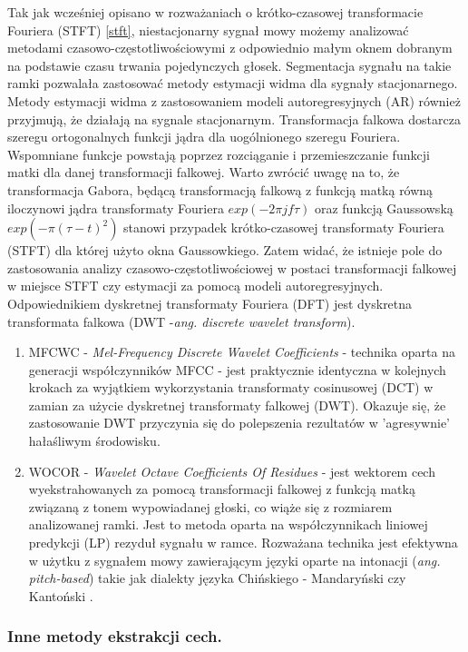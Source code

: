Tak jak wcześniej opisano w rozważaniach o krótko-czasowej transformacie Fouriera (STFT) \ref{stft}, niestacjonarny sygnał mowy możemy analizować metodami czasowo-częstotliwościowymi z odpowiednio małym oknem dobranym na podstawie czasu trwania pojedynczych głosek. Segmentacja sygnału na takie ramki pozwalała zastosować metody estymacji widma dla sygnały stacjonarnego. Metody estymacji widma z zastosowaniem modeli autoregresyjnych (AR) również przyjmują, że działają na sygnale stacjonarnym. Transformacja falkowa dostarcza szeregu ortogonalnych funkcji jądra dla uogólnionego szeregu Fouriera. Wspomniane funkcje powstają poprzez rozciąganie i przemieszczanie funkcji matki dla danej transformacji falkowej. Warto zwrócić uwagę na to, że transformacja Gabora, będącą transformacją falkową z funkcją matką równą iloczynowi jądra transformaty Fouriera $ exp(-2\pi j f \tau)$ oraz funkcją Gaussowską $ exp(-\pi(\tau-t)^2) $ stanowi przypadek krótko-czasowej transformaty Fouriera (STFT) dla której użyto okna Gaussowkiego. Zatem widać, że istnieje pole do zastosowania analizy czasowo-częstotliwościowej w postaci transformacji falkowej w miejsce STFT czy estymacji za pomocą modeli autoregresyjnych. Odpowiednikiem dyskretnej transformaty Fouriera (DFT) jest dyskretna transformata falkowa (DWT -\textit{ang. discrete wavelet transform}).
\begin{enumerate}
  \item{MFCWC - \textit{Mel-Frequency Discrete Wavelet Coefficients}} - technika oparta na generacji współczynników MFCC - jest praktycznie identyczna w kolejnych krokach za wyjątkiem wykorzystania transformaty cosinusowej (DCT) w zamian za użycie dyskretnej transformaty falkowej (DWT). Okazuje się, że zastosowanie DWT przyczynia się do polepszenia rezultatów w 'agresywnie' hałaśliwym środowisku\cite{fosr}.
  \item{WOCOR - \textit{Wavelet Octave Coefficients Of Residues}} - jest wektorem cech wyekstrahowanych za pomocą transformacji falkowej z funkcją matką związaną z tonem wypowiadanej głoski, co wiąże się z rozmiarem analizowanej ramki. Jest to metoda oparta na współczynnikach liniowej predykcji (LP) rezyduł sygnału w ramce. Rozważana technika jest efektywna w użytku z sygnałem mowy zawierającym języki oparte na intonacji (\textit{ang. pitch-based}) takie jak dialekty języka Chińskiego  - Mandaryński czy Kantoński \cite{fosr}.
\end{enumerate}

\subsubsection{Inne metody ekstrakcji cech.}
\label{otherfeatures}

